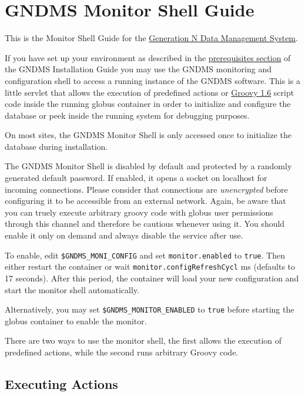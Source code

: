 \documentclass{article}
\begin{document}
\section{GNDMS Monitor Shell Guide}

This is the Monitor Shell Guide for the \href{../index.html}{Generation N Data Management System}.

If you have set up your environment as described in the
\href{/installation-guide/#prerequisites}{prerequisites section} of
the GNDMS Installation Guide you may use the GNDMS monitoring and
configuration shell to access a running instance of the GNDMS
software. This is a little servlet that allows the execution of
predefined actions or \href{http://groovy.codehaus.org}{Groovy 1.6}
script code inside the running globus container in order to
initialize and configure the database or peek inside the running
system for debugging purposes.

On most sites, the GNDMS Monitor Shell is only accessed once to
initialize the database during installation.

The GNDMS Monitor Shell is disabled by default and protected by a
randomly generated default password. If enabled, it opens a socket
on localhost for incoming connections. Please consider that
connections are \emph{unencrypted} before configuring it to be
accessible from an external network. Again, be aware that you can
truely execute arbitrary groovy code with globus user permissions
through this channel and therefore be cautious whenever using it.
You should enable it only on demand and always disable the service
after use.

To enable, edit \verb!$GNDMS_MONI_CONFIG! and set
\verb!monitor.enabled! to \verb!true!. Then either restart the
container or wait \verb!monitor.configRefreshCycl! ms (defaults to
17 seconds). After this period, the container will load your new
configuration and start the monitor shell automatically.

Alternatively, you may set \verb!$GNDMS_MONITOR_ENABLED! to
\verb!true! before starting the globus container to enable the
monitor.

There are two ways to use the monitor shell, the first allows the
execution of predefined actions, while the second runs arbitrary
Groovy code.

\subsection{Executing Actions}
\end{document}
